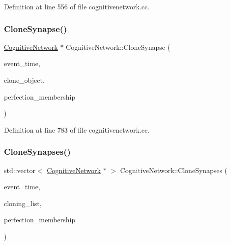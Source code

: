 Definition at line 556 of file cognitivenetwork.\+cc.

\mbox{\label{class_cognitive_network_a40f88d3ce9d386ee4db5c1e0ad84dad2}} 
\subsubsection{\texorpdfstring{Clone\+Synapse()}{CloneSynapse()}}
{\footnotesize\ttfamily \mbox{\hyperlink{class_cognitive_network}{Cognitive\+Network}} $\ast$ Cognitive\+Network\+::\+Clone\+Synapse (\begin{DoxyParamCaption}\item[{std\+::chrono\+::time\+\_\+point$<$ \mbox{\hyperlink{universe_8h_a0ef8d951d1ca5ab3cfaf7ab4c7a6fd80}{Clock}} $>$}]{event\+\_\+time,  }\item[{\mbox{\hyperlink{class_cognitive_network}{Cognitive\+Network}} $\ast$}]{clone\+\_\+object,  }\item[{double}]{perfection\+\_\+membership }\end{DoxyParamCaption})}



Definition at line 783 of file cognitivenetwork.\+cc.

\mbox{\label{class_cognitive_network_a82fe792704bcbf7df56b3023266f5f70}} 
\subsubsection{\texorpdfstring{Clone\+Synapses()}{CloneSynapses()}}
{\footnotesize\ttfamily std\+::vector$<$ \mbox{\hyperlink{class_cognitive_network}{Cognitive\+Network}} $\ast$ $>$ Cognitive\+Network\+::\+Clone\+Synapses (\begin{DoxyParamCaption}\item[{std\+::chrono\+::time\+\_\+point$<$ \mbox{\hyperlink{universe_8h_a0ef8d951d1ca5ab3cfaf7ab4c7a6fd80}{Clock}} $>$}]{event\+\_\+time,  }\item[{std\+::vector$<$ \mbox{\hyperlink{class_cognitive_network}{Cognitive\+Network}} $\ast$$>$}]{cloning\+\_\+list,  }\item[{double}]{perfection\+\_\+membership }\end{DoxyParamCaption})}



